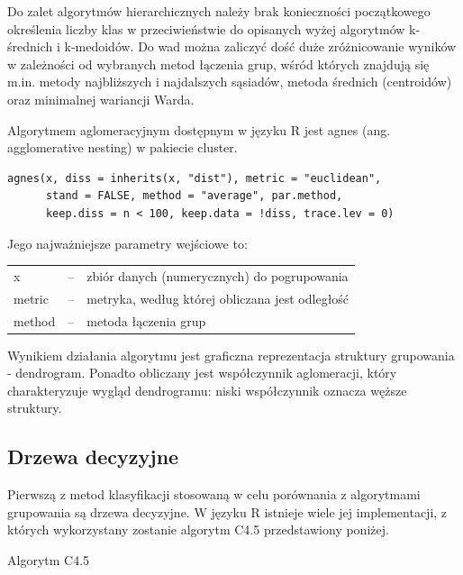 \documentclass[11pt,a4paper,twoside]{article}
\begin{document}
Do zalet algorytmów hierarchicznych należy brak konieczności początkowego określenia liczby klas w przeciwieństwie do opisanych wyżej algorytmów k-średnich i k-medoidów. Do wad można zaliczyć dość duże zróżnicowanie wyników w zależności od wybranych metod łączenia grup, wśród których znajdują się m.in. metody najbliższych i najdalszych sąsiadów, metoda średnich (centroidów) oraz minimalnej wariancji Warda.

Algorytmem aglomeracyjnym dostępnym w języku R jest agnes (ang. agglomerative nesting) w pakiecie cluster.

\begin{verbatim}
agnes(x, diss = inherits(x, "dist"), metric = "euclidean",
      stand = FALSE, method = "average", par.method,
      keep.diss = n < 100, keep.data = !diss, trace.lev = 0)
\end{verbatim} 

Jego najważniejsze parametry wejściowe to:

\begin{table}[ht]
\label{agnes_params}
\centering
\begin{tabularx}{\textwidth}{lcX}
 x & -- & zbiór danych (numerycznych) do pogrupowania \\
metric & -- & metryka, według której obliczana jest odległość \\
method & -- & metoda łączenia grup\\
\end{tabularx}
\end{table}

Wynikiem działania algorytmu jest graficzna reprezentacja struktury grupowania - dendrogram. Ponadto obliczany jest współczynnik aglomeracji, który charakteryzuje wygląd dendrogramu: niski współczynnik oznacza węższe struktury.

\subsection{Drzewa decyzyjne}

Pierwszą z metod klasyfikacji stosowaną w celu porównania z algorytmami grupowania są drzewa decyzyjne. W języku R istnieje wiele jej implementacji, z których wykorzystany zostanie algorytm C4.5 przedstawiony poniżej.

\begin{algorithm}[H]
\caption{Algorytm C4.5}
\label{decision_tree}
	\begin{algorithmic}
	\end{algorithmic}
\end{algorithm}
\end{document}
